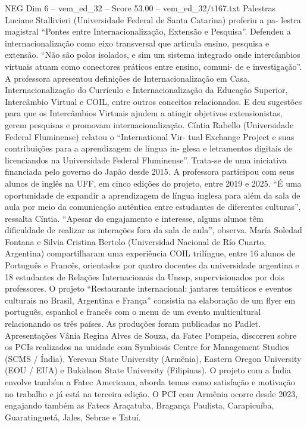 \begin{textsample}{NEG Dim 6 – vem\_ed\_32 – Score 53.00 – vem\_ed\_32/t167.txt}
Palestras Luciane Stallivieri (Universidade Federal de Santa Catarina) proferiu a pa- lestra magistral “Pontes entre Internacionalização, Extensão e Pesquisa”.
Defendeu a internacionalização como eixo transversal que articula ensino, pesquisa e extensão. “Não são polos isolados, e sim um sistema integrado onde intercâmbios virtuais atuam como conectores práticos entre ensino, comuni- de e investigação”.
A professora apresentou definições de Internacionalização em Casa, Internacionalização do Currículo e Internacionalização da Educação Superior, Intercâmbio Virtual e COIL, entre outros conceitos relacionados.
E deu sugestões para que os Intercâmbios Virtuais ajudem a atingir objetivos extensionistas, gerem pesquisas e promovam internacionalização.
Cíntia Rabello (Universidade Federal Fluminense) relatou o “International Vir- tual Exchange Project e suas contribuições para a aprendizagem de língua in- glesa e letramentos digitais de licenciandos na Universidade Federal Fluminense”.
Trata-se de uma iniciativa financiada pelo governo do Japão desde 2015.
A professora participou com seus alunos de inglês na UFF, em cinco edições do projeto, entre 2019 e 2025. “É uma oportunidade de expandir a aprendizagem de língua inglesa para além da sala de aula por meio da comunicação autêntica entre estudantes de diferentes culturas”, ressalta Cíntia. “Apesar do engajamento e interesse, alguns alunos têm dificuldade de realizar as interações fora da sala de aula”, observa.
María Soledad Fontana e Silvia Cristina Bertolo (Universidad Nacional de Río Cuarto, Argentina) compartilharam uma experiência COIL trilíngue, entre 16 alunos de Português e Francês, orientados por quatro docentes da universidade argentina e 18 estudantes de Relações Internacionais da Unesp, supervisionados por dois professores.
O projeto “Restaurante internacional: jantares temáticos e eventos culturais no Brasil, Argentina e França” consistia na elaboração de um flyer em português, espanhol e francês com o menu de um evento multicultural relacionando os três países.
As produções foram publicadas no Padlet.
Apresentações Vânia Regina Alves de Souza, da Fatec Pompeia, discorreu sobre os PCIs realizados na unidade com Symbiosis Centre for Management Studies (SCMS / Índia), Yerevan State University (Armênia), Eastern Oregon University (EOU / EUA) e Bukidnon State University (Filipinas).
O projeto com a Índia envolve também a Fatec Americana, aborda temas como satisfação e motivação no trabalho e já está na terceira edição.
O PCI com Armênia ocorre desde 2023, engajando também as Fatecs Araçatuba, Bragança Paulista, Carapicuíba, Guaratinguetá, Jales, Sebrae e Tatuí.

\end{textsample}
